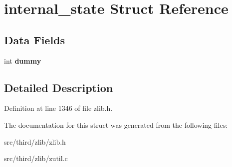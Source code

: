 \hypertarget{structinternal__state}{\section{internal\-\_\-state Struct Reference}
\label{d3/d8d/structinternal__state}
}
\subsection*{Data Fields}
\begin{DoxyCompactItemize}
\item 
\hypertarget{structinternal__state_ab000a3e3c901dd063859521988ad7e52}{int {\bfseries dummy}}\label{d3/d8d/structinternal__state_ab000a3e3c901dd063859521988ad7e52}

\end{DoxyCompactItemize}


\subsection{Detailed Description}


Definition at line 1346 of file zlib.\-h.



The documentation for this struct was generated from the following files\-:\begin{DoxyCompactItemize}
\item 
src/third/zlib/zlib.\-h\item 
src/third/zlib/zutil.\-c\end{DoxyCompactItemize}
